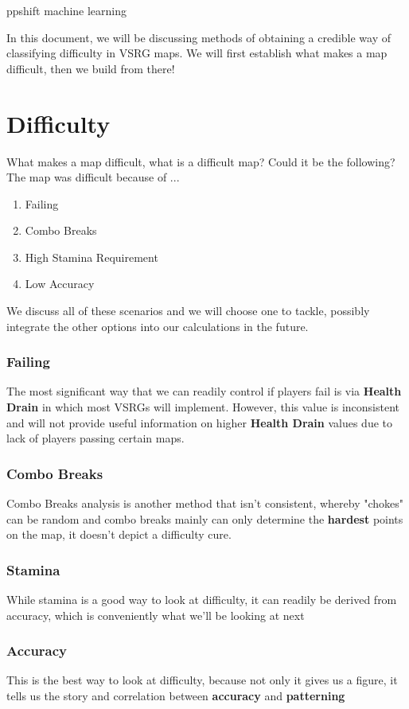 \documentclass{article}
\begin{document}
	ppshift machine learning
	
	In this document, we will be discussing methods of obtaining a credible way of classifying difficulty in VSRG maps. We will first establish what makes a map difficult, then we build from there!
	
\part{Difficulty}
	What makes a map difficult, what is a difficult map? Could it be the following?
	The map was difficult because of ...
\begin{enumerate}
	\item Failing
	\item Combo Breaks
	\item High Stamina Requirement
	\item Low Accuracy
\end{enumerate}
We discuss all of these scenarios and we will choose one to tackle, possibly integrate the other options into our calculations in the future.

\section{Failing}

The most significant way that we can readily control if players fail is via \textbf{Health Drain} in which most VSRGs will implement. However, this value is inconsistent and will not provide useful information on higher \textbf{Health Drain} values due to lack of players passing certain maps.

\section{Combo Breaks}

Combo Breaks analysis is another method that isn't consistent, whereby "chokes" can be random and combo breaks mainly can only determine the \textbf{hardest} points on the map, it doesn't depict a difficulty cure.

\section{Stamina}

While stamina is a good way to look at difficulty, it can readily be derived from accuracy, which is conveniently what we'll be looking at next

\section{Accuracy}

This is the best way to look at difficulty, because not only it gives us a figure, it tells us the story and correlation between \textbf{accuracy} and \textbf{patterning}
\end{document}
